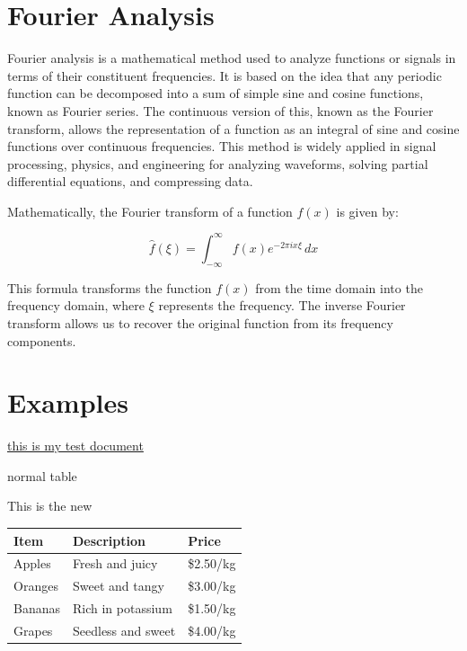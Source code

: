 \documentclass[12pt]{article}
\begin{document}
	\section*{Fourier Analysis}
	
	Fourier analysis is a mathematical method used to analyze functions or signals in terms of their constituent frequencies. It is based on the idea that any periodic function can be decomposed into a sum of simple sine and cosine functions, known as Fourier series. The continuous version of this, known as the Fourier transform, allows the representation of a function as an integral of sine and cosine functions over continuous frequencies. This method is widely applied in signal processing, physics, and engineering for analyzing waveforms, solving partial differential equations, and compressing data.
	
	Mathematically, the Fourier transform of a function \( f(x) \) is given by:
	
	$$ \hat{f}(\xi) = \int_{-\infty}^{\infty} f(x) e^{-2 \pi i x \xi} \, dx $$
	
	This formula transforms the function \( f(x) \) from the time domain into the frequency domain, where \( \xi \) represents the frequency. The inverse Fourier transform allows us to recover the original function from its frequency components.
	\section*{Examples}
	\underline{this is my test document}
	
	\par normal table 
	\par This is the new
	
		\begin{tabular}{@{}lll@{}}
			\toprule
			\textbf{Item}     & \textbf{Description}      & \textbf{Price}   \\ \midrule
			Apples    & Fresh and juicy              & \$2.50/kg  \\
			Oranges   & Sweet and tangy              & \$3.00/kg  \\
			Bananas   & Rich in potassium            & \$1.50/kg  \\
			Grapes    & Seedless and sweet           & \$4.00/kg  \\
			\bottomrule
		\end{tabular}
		
\end{document}
